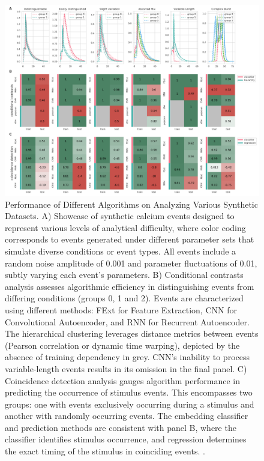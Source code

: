 \documentclass[utf8]{FrontiersinHarvard}
\begin{document}
    \begin{figure}[!htb]
        \begin{center}
            \includegraphics[width=\linewidth]{figures/6.png}
        \end{center}
        \caption{
            Performance of Different Algorithms on Analyzing Various Synthetic Datasets. A) Showcase of synthetic calcium events designed to represent various levels of analytical difficulty, where color coding corresponds to events generated under different parameter sets that simulate diverse conditions or event types. All events include a random noise amplitude of 0.001 and parameter fluctuations of 0.01, subtly varying each event's parameters. B) Conditional contrasts analysis assesses algorithmic efficiency in distinguishing events from differing conditions (groups 0, 1 and 2). Events are characterized using different methods: FExt for Feature Extraction, CNN for Convolutional Autoencoder, and RNN for Recurrent Autoencoder. The hierarchical clustering leverages distance metrics between events (Pearson correlation or dynamic time warping), depicted by the absence of training dependency in grey. CNN's inability to process variable-length events results in its omission in the final panel. C) Coincidence detection analysis gauges algorithm performance in predicting the occurrence of stimulus events. This encompasses two groups: one with events exclusively occurring during a stimulus and another with randomly occurring events. The embedding classifier and prediction methods are consistent with panel B, where the classifier identifies stimulus occurrence, and regression determines the exact timing of the stimulus in coinciding events. .
        }\label{fig:6}
    \end{figure}
\end{document}
